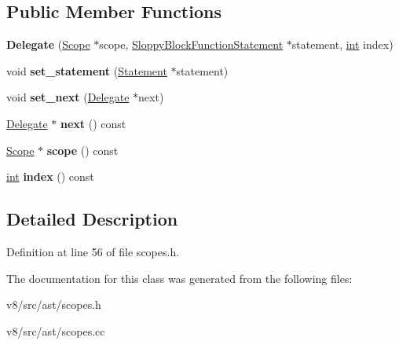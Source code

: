 \subsection*{Public Member Functions}
\begin{DoxyCompactItemize}
\item 
\mbox{\label{classv8_1_1internal_1_1SloppyBlockFunctionMap_1_1Delegate_a9e0f3c33572e2521053f8d97fd4806d6}} 
{\bfseries Delegate} (\mbox{\hyperlink{classv8_1_1internal_1_1Scope}{Scope}} $\ast$scope, \mbox{\hyperlink{classv8_1_1internal_1_1SloppyBlockFunctionStatement}{Sloppy\+Block\+Function\+Statement}} $\ast$statement, \mbox{\hyperlink{classint}{int}} index)
\item 
\mbox{\label{classv8_1_1internal_1_1SloppyBlockFunctionMap_1_1Delegate_acebc2287d8a0e34bc782298586c95faa}} 
void {\bfseries set\+\_\+statement} (\mbox{\hyperlink{classv8_1_1internal_1_1Statement}{Statement}} $\ast$statement)
\item 
\mbox{\label{classv8_1_1internal_1_1SloppyBlockFunctionMap_1_1Delegate_adc05d2fdedaeb6f10d21b3c59b2be05d}} 
void {\bfseries set\+\_\+next} (\mbox{\hyperlink{classv8_1_1internal_1_1SloppyBlockFunctionMap_1_1Delegate}{Delegate}} $\ast$next)
\item 
\mbox{\label{classv8_1_1internal_1_1SloppyBlockFunctionMap_1_1Delegate_aa93e28d314ccb7b279d0ceb78de16d2c}} 
\mbox{\hyperlink{classv8_1_1internal_1_1SloppyBlockFunctionMap_1_1Delegate}{Delegate}} $\ast$ {\bfseries next} () const
\item 
\mbox{\label{classv8_1_1internal_1_1SloppyBlockFunctionMap_1_1Delegate_ac14dceb30b77c65ed30a861c4c98e21b}} 
\mbox{\hyperlink{classv8_1_1internal_1_1Scope}{Scope}} $\ast$ {\bfseries scope} () const
\item 
\mbox{\label{classv8_1_1internal_1_1SloppyBlockFunctionMap_1_1Delegate_ae43d6304632bd363283bf8563dded124}} 
\mbox{\hyperlink{classint}{int}} {\bfseries index} () const
\end{DoxyCompactItemize}


\subsection{Detailed Description}


Definition at line 56 of file scopes.\+h.



The documentation for this class was generated from the following files\+:\begin{DoxyCompactItemize}
\item 
v8/src/ast/scopes.\+h\item 
v8/src/ast/scopes.\+cc\end{DoxyCompactItemize}

